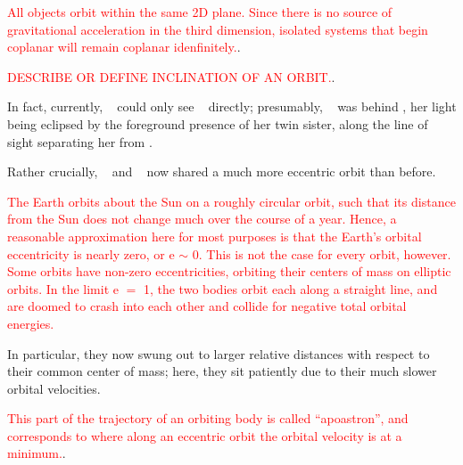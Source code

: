 \documentclass[main.tex]{subfiles}
\begin{document}
\begin{tcolorbox}[sharp corners, colback=red!30, colframe=red!80!blue, title=Coplanar]
\par \textcolor{red}{All objects orbit within the same 2D plane. Since there is no source of gravitational acceleration in the third dimension, isolated systems that begin coplanar will remain coplanar idenfinitely.}.  
\end{tcolorbox}

\begin{tcolorbox}[sharp corners, colback=red!30, colframe=red!80!blue, title=Orbital Inclination]
\par \textcolor{red}{DESCRIBE OR DEFINE INCLINATION OF AN ORBIT.}.  
\end{tcolorbox}

\par \nar  In fact, currently, \rmcelaeno~ could only see \rmalcyone~ directly; presumably, \rmtaygete~ was behind \rmalcyone, her light being eclipsed by the foreground presence of her twin sister, along the line of sight separating her from \rmcelaeno.

\par \nar Rather crucially, \rmtaygete~ and \rmalcyone~ now shared a much more eccentric orbit than before.

\begin{tcolorbox}[sharp corners, colback=red!30, colframe=red!80!blue, title=Orbital Eccentricity]
\par \textcolor{red}{The Earth orbits about the Sun on a roughly circular orbit, such that its distance from the Sun does not change much over the course of a year.  Hence, a reasonable approximation here for most purposes is that the Earth's orbital eccentricity is nearly zero, or e $\sim$ 0.  This is not the case for every orbit, however.  Some orbits have non-zero eccentricities, orbiting their centers of mass on elliptic orbits.  In the limit e $=$ 1, the two bodies orbit each along a straight line, and are doomed to crash into each other and collide for negative total orbital energies.}  
\end{tcolorbox}

\par \nar In particular, they now swung out to larger relative distances with respect to their common center of mass; here, they sit patiently due to their much slower orbital velocities. 

\begin{tcolorbox}[sharp corners, colback=red!30, colframe=red!80!blue, title=Apoastron]
\par \textcolor{red} {This part of the trajectory of an orbiting body is called ``apoastron'', and corresponds to where along an eccentric orbit the orbital velocity is at a minimum.}.  
\end{tcolorbox}
\end{document}
